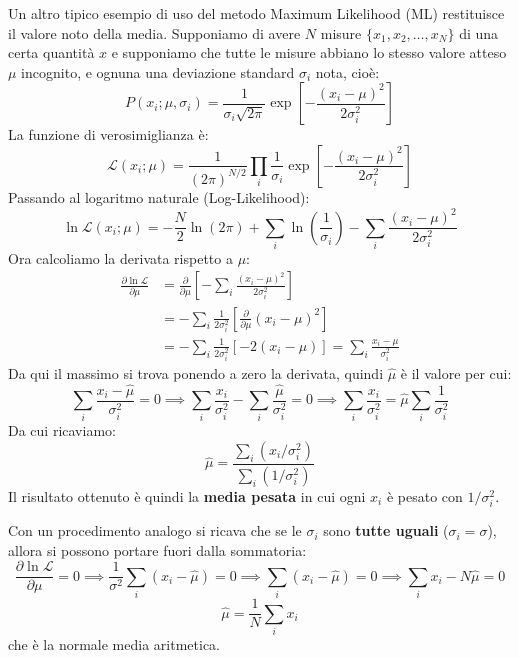 \documentclass[openany,a4paper,12pt]{book}
\providecommand{\mathscr}[1]{\mathcal{#1}}
\theoremstyle{remark}
\begin{document}
Un altro tipico esempio di uso del metodo Maximum Likelihood (ML) restituisce il valore noto della media. Supponiamo di avere $N$ misure $\{x_1, x_2, \dots, x_N\}$ di una certa quantità $x$ e supponiamo che tutte le misure abbiano lo stesso valore atteso $\mu$ incognito, e ognuna una deviazione standard $\sigma_i$ nota, cioè:
\begin{equation}
    P(x_i; \mu, \sigma_i) = \frac{1}{\sigma_i \sqrt{2\pi}} \exp\left[ -\frac{(x_i - \mu)^2}{2\sigma_i^2} \right]
\end{equation}
La funzione di verosimiglianza è:
\begin{equation}
    \mathscr{L}(x_i; \mu) = \frac{1}{(2\pi)^{N/2}} \prod_i \frac{1}{\sigma_i} \exp\left[ -\frac{(x_i - \mu)^2}{2\sigma_i^2} \right]
\end{equation}
Passando al logaritmo naturale (Log-Likelihood):
\begin{equation}
    \ln \mathscr{L}(x_i; \mu) = -\frac{N}{2}\ln(2\pi) + \sum_i \ln\left(\frac{1}{\sigma_i}\right) - \sum_i \frac{(x_i - \mu)^2}{2\sigma_i^2}
\end{equation}
Ora calcoliamo la derivata rispetto a $\mu$:
\begin{align*}
    \frac{\partial \ln \mathscr{L}}{\partial \mu} &= \frac{\partial}{\partial \mu} \left[ -\sum_i \frac{(x_i - \mu)^2}{2\sigma_i^2} \right] \\
    &= -\sum_i \frac{1}{2\sigma_i^2} \left[ \frac{\partial}{\partial \mu} (x_i - \mu)^2 \right] \\
    &= -\sum_i \frac{1}{2\sigma_i^2} \left[ -2(x_i - \mu) \right] = \sum_i \frac{x_i - \mu}{\sigma_i^2}
\end{align*}
Da qui il massimo si trova ponendo a zero la derivata, quindi $\hat{\mu}$ è il valore per cui:
\begin{equation}
    \sum_i \frac{x_i - \hat{\mu}}{\sigma_i^2} = 0 \implies \sum_i \frac{x_i}{\sigma_i^2} - \sum_i \frac{\hat{\mu}}{\sigma_i^2} = 0 \implies \sum_i \frac{x_i}{\sigma_i^2} = \hat{\mu} \sum_i \frac{1}{\sigma_i^2}
\end{equation}
Da cui ricaviamo:
\begin{equation}
    \boxed{ \hat{\mu} = \frac{\sum_i (x_i / \sigma_i^2)}{\sum_i (1 / \sigma_i^2)} }
\end{equation}
Il risultato ottenuto è quindi la \textbf{media pesata} in cui ogni $x_i$ è pesato con $1/\sigma_i^2$.

Con un procedimento analogo si ricava che se le $\sigma_i$ sono \textbf{tutte uguali} ($\sigma_i = \sigma$), allora si possono portare fuori dalla sommatoria:
\begin{equation}
    \frac{\partial \ln \mathscr{L}}{\partial \mu} = 0 \implies \frac{1}{\sigma^2} \sum_i (x_i - \hat{\mu}) = 0 \implies \sum_i (x_i - \hat{\mu}) = 0 \implies \sum_i x_i - N\hat{\mu} = 0
\end{equation}
\begin{equation}
    \boxed{ \hat{\mu} = \frac{1}{N} \sum_i x_i }
\end{equation}
che è la normale media aritmetica.
\end{document}

